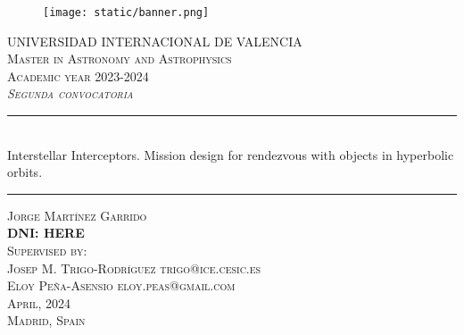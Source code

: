 \begin{titlepage}

  \begin{center}

    \begin{figure}[h]
      \centering
      \texttt{[image: static/banner.png]}
    \end{figure}
    \vspace{1cm}

    \textsc{\large
      UNIVERSIDAD INTERNACIONAL DE VALENCIA
    }\\[0.25cm]
    \textsc{\large
      Master in Astronomy and Astrophysics \\
      Academic year 2023-2024
    }\\[1.5cm]
    \textsc{\large
    \textit{Segunda convocatoria}
    }\\[1.5cm]

    \noindent\rule{\textwidth}{1pt}
    \\[0.25cm]
    {
    \fontsize{35pt}{35pt}\selectfont
    {
      Interstellar Interceptors. Mission design for rendezvous with objects in hyperbolic orbits.
    }
    }
    \noindent\rule{\textwidth}{1pt}

    \vspace{1.5cm}
    \textsc{\Large
      Jorge Martínez Garrido \\
      \textbf{DNI: HERE}
    }\\[1.25cm]
    \textsc{\large
      Supervised by:
    }\\[0.25cm]
    \textsc{\large
     Josep M. Trigo-Rodríguez trigo@ice.cesic.es \\
     Eloy Peña-Asensio eloy.peas@gmail.com
    }\\[2cm]

    \textsc{\large
       April, 2024
    }\\[0.25cm]
    \textsc{\large
       Madrid, Spain
    }\\[0.25cm]

  \end{center}
\end{titlepage}
